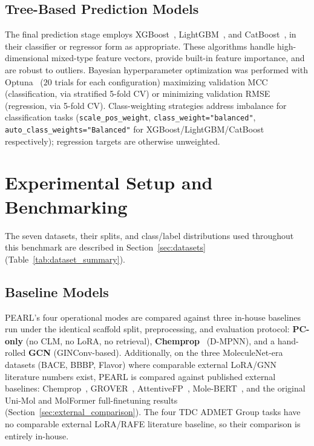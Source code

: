 \documentclass[pdflatex,sn-mathphys-num]{sn-jnl}%
\begin{document}
\subsection{Tree-Based Prediction Models}\label{sec:tree_models}
The final prediction stage employs XGBoost~\cite{chen2016xgboost}, LightGBM~\cite{ke2017lightgbm}, and CatBoost~\cite{prokhorenkova2018catboost}, in their classifier or regressor form as appropriate. These algorithms handle high-dimensional mixed-type feature vectors, provide built-in feature importance, and are robust to outliers. Bayesian hyperparameter optimization was performed with Optuna~\cite{akiba2019optuna} ($20$ trials for each configuration) maximizing validation MCC (classification, via stratified 5-fold CV) or minimizing validation RMSE (regression, via 5-fold CV). Class-weighting strategies address imbalance for classification tasks (\texttt{scale\_pos\_weight}, \texttt{class\_weight="balanced"}, \texttt{auto\_class\_weights="Balanced"} for XGBoost/LightGBM/CatBoost respectively); regression targets are otherwise unweighted.

\section{Experimental Setup and Benchmarking}\label{sec:experimental_setup}
The seven datasets, their splits, and class/label distributions used throughout this benchmark are described in Section~\ref{sec:datasets} (Table~\ref{tab:dataset_summary}).

\subsection{Baseline Models}\label{sec:baselines}
PEARL's four operational modes are compared against three in-house baselines run under the identical scaffold split, preprocessing, and evaluation protocol: \textbf{PC-only} (no CLM, no LoRA, no retrieval), \textbf{Chemprop}~\cite{yang2019chemprop} (D-MPNN), and a hand-rolled \textbf{GCN} (GINConv-based). Additionally, on the three MoleculeNet-era datasets (BACE, BBBP, Flavor) where comparable external LoRA/GNN literature numbers exist, PEARL is compared against published external baselines: Chemprop~\cite{yang2019chemprop}, GROVER~\cite{rong2020grover}, AttentiveFP~\cite{xiong2020attentivefp}, Mole-BERT~\cite{xia2023molecbert}, and the original Uni-Mol and MolFormer full-finetuning results (Section~\ref{sec:external_comparison}). The four TDC ADMET Group tasks have no comparable external LoRA/RAFE literature baseline, so their comparison is entirely in-house.
\end{document}
